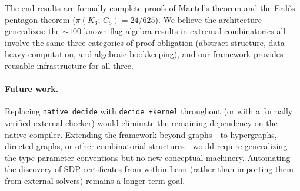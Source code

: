 \documentclass{article}
\newcommand{\tdensity}[2]{\pi(#1;\,#2)}
\newcommand{\lean}[1]{\texttt{#1}}
\begin{document}
The end results are formally complete proofs of Mantel's theorem and the
Erd\H{o}s pentagon theorem ($\tdensity{K_3}{C_5} = 24/625$).  We believe
the architecture generalizes: the $\sim 100$ known flag algebra results in
extremal combinatorics all involve the same three categories of proof
obligation (abstract structure, data-heavy computation, and algebraic
bookkeeping), and our framework provides reusable infrastructure for all three.

\paragraph{Future work.}
Replacing \lean{native\_decide} with \lean{decide +kernel} throughout (or
with a formally verified external checker) would eliminate the remaining
dependency on the native compiler.  Extending the framework beyond graphs---to
hypergraphs, directed graphs, or other combinatorial structures---would require
generalizing the type-parameter conventions but no new conceptual machinery.
Automating the discovery of SDP certificates from within Lean (rather than
importing them from external solvers) remains a longer-term goal.
\end{document}
